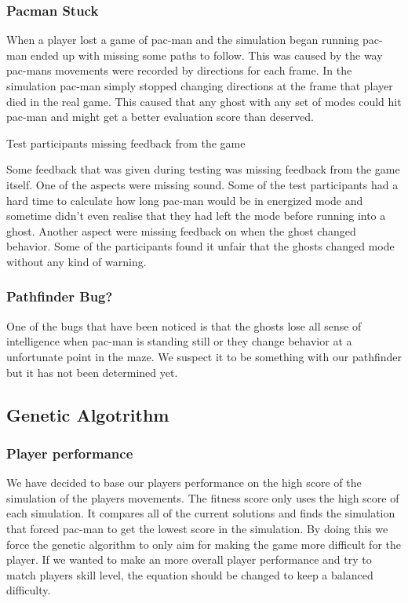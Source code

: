 \subsubsection{Pacman Stuck}

When a player lost a game of pac-man and the simulation began running pac-man ended up with missing some paths to follow. This was caused by the way pac-mans movements were recorded by directions for each frame. In the simulation pac-man simply stopped changing directions at the frame that player died in the real game. This caused that any ghost with any set of modes could hit pac-man and might get a better evaluation score than deserved. 


Test participants missing feedback from the game

Some feedback that was given during testing was missing feedback from the game itself. One of the aspects were missing sound. Some of the test participants had a hard time to calculate how long pac-man would be in energized mode and sometime didn’t even realise that they had left the mode before running into a ghost. Another aspect were missing feedback on when the ghost changed behavior. Some of the participants found it unfair that the ghosts changed mode without any kind of warning.


\subsubsection{Pathfinder Bug?}

One of the bugs that have been noticed is that the ghosts lose all sense of intelligence when pac-man is standing still or they change behavior at a unfortunate point in the maze. We suspect it to be something with our pathfinder but it has not been determined yet. 



\subsection{Genetic Algotrithm}

\subsubsection{Player performance} 

We have decided to base our players performance on the high score of the simulation of the players movements. The fitness score only uses the high score of each simulation. It compares all of the current solutions and finds the simulation that forced pac-man to get the lowest score in the simulation. By doing this we force the genetic algorithm to only aim for making the game more difficult for the player. If we wanted to make an more overall player performance and try to match players skill level, the equation should be changed to keep a balanced difficulty. 

